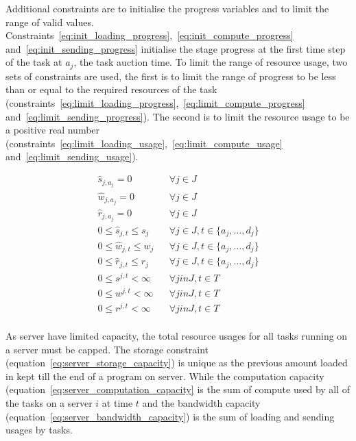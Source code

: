 Additional constraints are to initialise the progress variables and to limit the range of valid values.
Constraints~\ref{eq:init_loading_progress},~\ref{eq:init_compute_progress} and~\ref{eq:init_sending_progress} initialise
the stage progress at the first time step of the task at $a_j$, the task auction time. To limit the range of resource
usage, two sets of constraints are used, the first is to limit the range of progress to be less than or equal to the
required resources of the task (constraints~\ref{eq:limit_loading_progress},~\ref{eq:limit_compute_progress}
and~\ref{eq:limit_sending_progress}). The second is to limit the resource usage to be a positive real number
(constraints~\ref{eq:limit_loading_usage},~\ref{eq:limit_compute_usage} and~\ref{eq:limit_sending_usage}).

\begin{align}
    \hat{s}_{j, a_j} = 0 && \forall{j \in J} \label{eq:init_loading_progress} \\
    \hat{w}_{j, a_j} = 0 && \forall{j \in J} \label{eq:init_compute_progress} \\
    \hat{r}_{j, a_j} = 0 && \forall{j \in J} \label{eq:init_sending_progress} \\

    0 \leq \hat{s}_{j,t} \leq s_j && \forall{j \in J, t \in \{a_j, \dots, d_j\}} \label{eq:limit_loading_progress} \\
    0 \leq \hat{w}_{j,t} \leq w_j && \forall{j \in J, t \in \{a_j, \dots, d_j\}} \label{eq:limit_compute_progress} \\
    0 \leq \hat{r}_{j,t} \leq r_j && \forall{j \in J, t \in \{a_j, \dots, d_j\}} \label{eq:limit_sending_progress} \\

    0 \leq s^{j,t} < \infty && \forall{j in J, t \in T} \label{eq:limit_loading_usage} \\
    0 \leq w^{j,t} < \infty && \forall{j in J, t \in T} \label{eq:limit_compute_usage} \\
    0 \leq r^{j,t} < \infty && \forall{j in J, t \in T} \label{eq:limit_sending_usage} \\
\end{align}

As server have limited capacity, the total resource usages for all tasks running on a server must be capped.
The storage constraint (equation~\eqref{eq:server_storage_capacity}) is unique as the previous amount
loaded in kept till the end of a program on server. While the computation capacity
(equation~\eqref{eq:server_computation_capacity} is the sum of compute used by all of the tasks on a server $i$ at
time $t$ and the bandwidth capacity (equation~\eqref{eq:server_bandwidth_capacity}) is the sum of loading and sending
usages by tasks.

